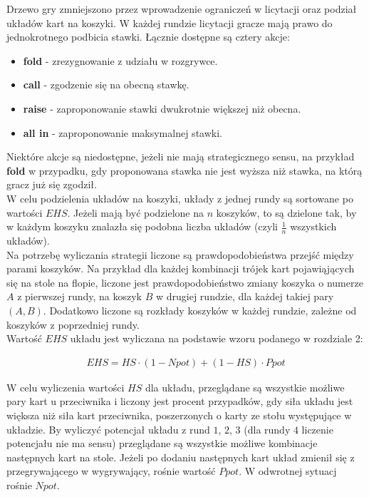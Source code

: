 \documentclass[licencjacka]{pracamgr}
\begin{document}
Drzewo gry zmniejszono przez wprowadzenie ograniczeń w licytacji oraz podział układów kart na koszyki.
W każdej rundzie licytacji gracze mają prawo do jednokrotnego podbicia stawki. Łącznie dostępne są cztery akcje:

\begin{itemize}
\item \textbf{fold} - zrezygnowanie z udziału w rozgrywce.
\item \textbf{call} - zgodzenie się na obecną stawkę.
\item \textbf{raise} - zaproponowanie stawki dwukrotnie większej niż obecna.
\item \textbf{all in} - zaproponowanie maksymalnej stawki.
\end{itemize}

\noindent
Niektóre akcje są niedostępne, jeżeli nie mają strategicznego sensu, na przykład \textbf{fold} w przypadku, gdy
proponowana stawka nie jest wyższa niż stawka, na którą gracz już się zgodził. \\

\noindent
W celu podzielenia układów na koszyki, układy z jednej rundy są sortowane po wartości $EHS$. Jeżeli mają być podzielone na
$n$ koszyków, to są dzielone tak, by w każdym koszyku znalazła się podobna liczba układów (czyli $\frac{1}{n}$ wszystkich układów). \\

\noindent
Na potrzebę wyliczania strategii liczone są prawdopodobieństwa przejść między parami koszyków. Na przykład dla każdej kombinacji
trójek kart pojawiąjących się na stole na flopie, liczone jest prawdopodobieństwo zmiany koszyka o numerze $A$ z pierwszej
rundy, na koszyk $B$ w drugiej rundzie, dla każdej takiej pary $(A, B)$. Dodatkowo liczone są rozkłady koszyków
w każdej rundzie, zależne od koszyków z poprzedniej rundy. \\

\noindent
Wartość $EHS$ układu jest wyliczana na podstawie wzoru podanego w rozdziale 2:

\begin{align*}
EHS = HS \cdot (1 - Npot) + (1 - HS) \cdot Ppot
\end{align*}

\noindent
W celu wyliczenia wartości $HS$ dla układu, przeglądane są wszystkie możliwe pary kart u przeciwnika i liczony jest procent
przypadków, gdy siła układu jest większa niż siła kart przeciwnika, poszerzonych o karty ze stołu występujące w układzie.
By wyliczyć potencjał układu z rund $1$, $2$, $3$ (dla rundy $4$ liczenie potencjału nie ma sensu) przeglądane są wszystkie
możliwe kombinacje następnych kart na stole. Jeżeli po dodaniu następnych kart układ zmienił się z przegrywającego w
wygrywający, rośnie wartość $Ppot$. W odwrotnej sytuacj rośnie $Npot$. \\
\end{document}
